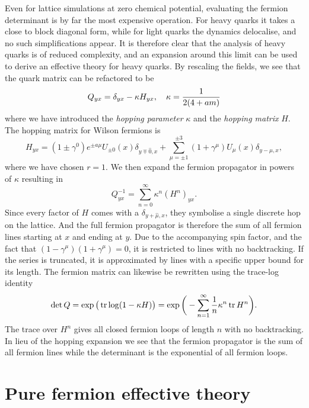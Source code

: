 Even for lattice simulations at zero chemical potential, evaluating the fermion
determinant is by far the most expensive operation. For heavy quarks it takes a
close to block diagonal form, while for light quarks the dynamics delocalise,
and no such simplifications appear. It is therefore clear that the analysis of
heavy quarks is of reduced complexity, and an expansion around this limit can be
used to derive an effective theory for heavy quarks. By rescaling the fields, we
see that the quark matrix can be refactored to be
%
\begin{equation}
  Q_{yx} = \delta_{yx} - \kappa H_{yx}, \hskip1em \kappa = \frac{1}{2(4 + am)}
\end{equation}
%
where we have introduced the \emph{hopping parameter} $\kappa$ and the
\emph{hopping matrix} $H$. The hopping matrix for Wilson fermions is
%
\begin{equation}
  H_{yx} = (1 \pm \gamma^0) e^{\pm a\mu} U_{\pm 0}(x) \delta_{y \mp \hat{0},x}
    + \sum_{\mu = \pm 1}^{\pm 3} (1 + \gamma^{\mu}) U_{\mu}(x) \delta_{y-\hat{\mu},x},
\end{equation}
%
where we have chosen $r=1$. We then expand the fermion propagator in powers of
$\kappa$ resulting in
%
\begin{equation}
  Q^{-1}_{yx} = \sum_{n=0}^{\infty} \kappa^n (H^n)_{yx} .
\end{equation}
%
Since every factor of $H$ comes with a $\delta_{y+\hat{\mu},x}$, they symbolise
a single discrete hop on the lattice. And the full fermion propagator is
therefore the sum of all fermion lines starting at $x$ and ending at $y$. Due to
the accompanying spin factor, and the fact that $(1 - \gamma^{\mu}) (1 +
\gamma^{\mu}) = 0$, it is restricted to lines with no backtracking.  If the
series is truncated, it is approximated by lines with a specific upper bound for
its length. The fermion matrix can likewise be rewritten using the trace-log
identity
%
\begin{equation}
  \det Q = \exp \big(\operatorname{tr} \log (1 - \kappa H) \big) = \exp \bigg( -\sum_{n=1}^{\infty} \frac{1}{n}
  \kappa^n \operatorname{tr} H^n \bigg).
\end{equation}
%
The trace over $H^n$ gives all closed fermion loops of length $n$ with no
backtracking. In lieu of the hopping expansion we see that the fermion
propagator is the sum of all fermion lines while the determinant is the
exponential of all fermion loops.

\section{Pure fermion effective theory} \label{sec:pure-fermion-eff-theory}


